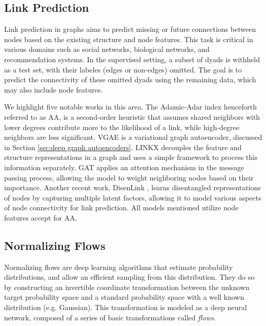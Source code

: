 \documentclass{article}
\theoremstyle{plain}
\theoremstyle{definition}
\theoremstyle{remark}
\begin{document}


\subsection{Link Prediction}
\label{sec:link prediction theory}
Link prediction in graphs aims to predict missing or future connections between nodes based on the existing structure and node features. This task is critical in various domains such as social networks, biological networks, and recommendation systems. In the supervised setting, a subset of dyads is withheld as a test set, with their labeles (edges or non-edges) omitted. The goal is to predict the connectivity of these omitted dyads using the remaining data, which may also include node features.

We highlight five notable works in this area. The Adamic-Adar index \cite{adamic2003friends} henceforth referred to as AA, is a second-order heuristic that assumes shared neighbors with lower degrees contribute more to the likelihood of a link, while high-degree neighbors are less significant. VGAE \cite{kipf2016variational} is a variational graph autoencoder, discussed in Section \ref{sec:deep graph autoencoders}. LINKX \cite{lim2021linkx} decouples the feature and structure representations in a graph and uses a simple framework to process this information separately. GAT \cite{GAT} applies an attention mechanism in the message passing process, allowing the model to weight neighboring nodes based on their importance. Another recent work, DisenLink \cite{zhou2022disenlink}, learns disentangled representations of nodes by capturing multiple latent factors, allowing it to model various aspects of node connectivity for link prediction. All models mentioned utilize node features accept for AA.


\subsection{Normalizing Flows}
\label{extended_sec:normflows}

Normalizing flows are deep learning algorithms that estimate  probability distributions, and allow an efficient sampling from this distribution. They do so by constructing an invertible coordinate transformation between the unknown target probability space and a standard probability space with a well known distribution (e.g. Gaussian). This transformation is modeled as a deep neural network, composed of a series of basic transformations called \emph{flows}. 
\end{document}
